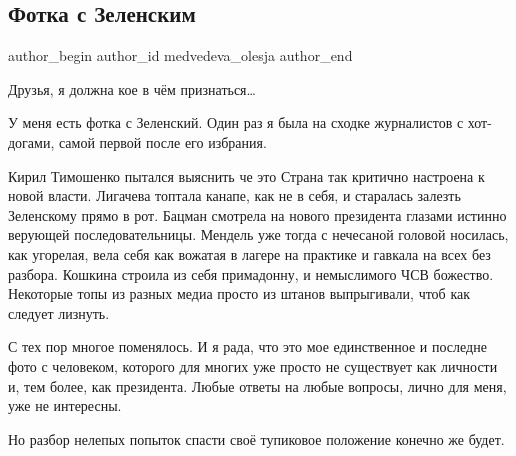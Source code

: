  
 
 
 
 
 
\subsection{Фотка с Зеленским}
\label{sec:26_11_2021.fb.medvedeva_olesja.1.fotka_s_zelenskim}
 
\ifcmt
 author_begin
   author_id medvedeva_olesja
 author_end
\fi

Друзья, я должна кое в чём признаться…

У меня есть фотка с Зеленский. Один раз я была на сходке журналистов с
хот-догами, самой первой после его избрания.

Кирил Тимошенко пытался выяснить че это Страна так критично настроена к новой
власти. Лигачева топтала канапе, как не в себя, и старалась залезть Зеленскому
прямо в рот. Бацман смотрела на нового президента глазами истинно верующей
последовательницы. Мендель уже тогда с нечесаной головой носилась, как
угорелая, вела себя как вожатая в лагере на практике и гавкала на всех без
разбора. Кошкина строила из себя примадонну, и немыслимого ЧСВ божество.
Некоторые топы из разных медиа просто из штанов выпрыгивали, чтоб как следует
лизнуть. 

С тех пор многое поменялось. И я рада, что это мое единственное и последне фото
с человеком, которого для многих уже просто не существует как личности и, тем
более, как президента. Любые ответы на любые вопросы, лично для меня, уже не
интересны. 

Но разбор нелепых попыток спасти своё  тупиковое положение конечно же будет.

